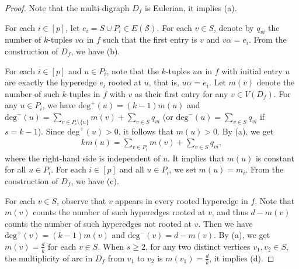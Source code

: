 \documentclass[10pt,a4paper]{amsart}
\begin{document}
\begin{proof}

Note that the multi-digraph $D_f$ is Eulerian, it implies (a).

For each $i \in [p]$, let $e_i =S \cup P_i \in E(\mathcal{S})$.
For each $v \in S$, denote by $q_{vi}$ the number of $k$-tuples $v\alpha$ in $f$ such that the first entry is $v$ and $v\alpha=e_i$.
From the construction of $D_{f}$,  we have (b).


For each $i \in [p]$ and $u \in P_{i}$,
note that the $k$-tuples $u\alpha$ in $f$ with initial entry $u$ are exactly the hyperedge $e_i$ rooted at $u$, that is, $u\alpha=e_i$.
Let $m(v)$ denote the number of such $k$-tuples in $f$ with $v$ as their first entry for any $v \in V(D_{f})$.
For any $u \in P_{i}$,  we have $\mathrm{deg}^+(u)=(k-1)m(u)$
and $\mathrm{deg}^-(u)=\sum_{v\in P_{i}\setminus\{u\}}m(v)+\sum_{v\in S}q_{vi}$
(or $\mathrm{deg}^-(u)=\sum_{v\in S}q_{vi}$ if $s=k-1$).
Since $\mathrm{deg}^+(u)>0$, it follows that $m(u) >0$.
By (a),
we get
\begin{align}\label{eqpi}
km(u)=\sum_{v\in P_{i}}m(v)+\sum_{v\in S}q_{vi},
\end{align}
where the right-hand side is independent of $u$. It implies that $m(u)$ is constant for all $u \in P_{i}$.
For each $i \in [p]$ and all $u \in P_{i}$, we set $m(u)=m_{i}$.
From the construction of $D_{f}$, we have (c).



For each $v \in S$, observe that $v$ appears in every rooted hyperedge in $f$.
Note that $m(v)$ counts the number of such hyperedges rooted at $v$,
and thus $d-m(v)$ counts the number of such hyperedges not rooted at $v$.
Then we have $\mathrm{deg}^+(v)=(k-1)m(v)$ and $\mathrm{deg}^-(v)=d-m(v)$.
By (a),
we get $m(v)=\frac{d}{k}$ for each $v \in S$.
When $s \geq 2$, for any two distinct vertices $v_1,v_2 \in S$, the multiplicity of arc in $D_f$ from $v_1$ to $v_2$ is $m(v_1)=\frac{d}{k}$, it implies (d).
\end{proof}
\end{document}
